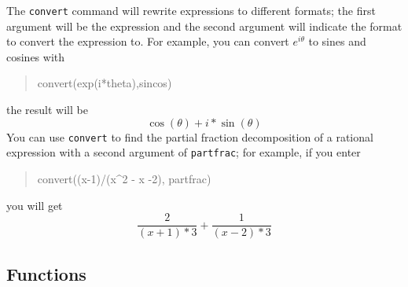 \documentclass{article}
\newcommand{\xcasin}[1]
{\begin{quote}\ttfamily
#1
\end{quote}}
\newcommand{\xcasout}[1]
{\begin{equation*}
#1
\end{equation*}}
\begin{document}
The \texttt{convert} command will rewrite expressions to different
formats; the first argument will be the expression and the second
argument will indicate the format to convert the expression to.  For
example, you can convert $e^{i \theta}$ to sines and cosines with
\xcasin{convert(exp(i*theta),sincos)}
the result will be
\xcasout{\cos(\theta) + i*\sin(\theta)}
You can use \texttt{convert} to find the partial fraction
decomposition of a rational expression with a second argument of
\texttt{partfrac}; for example, if you enter
\xcasin{convert((x-1)/(x\^{}2 - x -2), partfrac)}
you will get
\xcasout{\frac{2}{(x+1)*3} + \frac{1}{(x-2)*3}}


\subsection{Functions}
\end{document}
